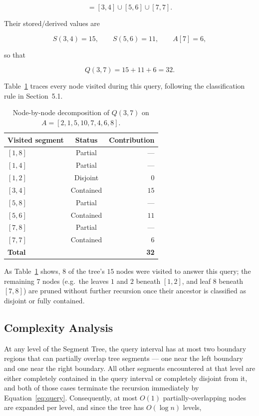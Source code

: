 \documentclass[11pt]{article}
\begin{document}
\begin{equation}
[3,7] = [3,4] \cup [5,6] \cup [7,7].
\end{equation}

Their stored/derived values are

\begin{equation}
S(3,4) = 15, \qquad S(5,6) = 11, \qquad A[7] = 6,
\end{equation}

so that

\begin{equation}
Q(3,7) = 15 + 11 + 6 = 32.
\end{equation}

Table~\ref{tab:decomp} traces every node visited during this query, following the classification rule in Section~5.1.

\begin{table}[h]
\centering
\caption{Node-by-node decomposition of $Q(3,7)$ on $A=[2,1,5,10,7,4,6,8]$.}
\label{tab:decomp}
\begin{tabular}{lcr}
\toprule
\textbf{Visited segment} & \textbf{Status} & \textbf{Contribution} \\
\midrule
$[1,8]$ & Partial   & --- \\
$[1,4]$ & Partial   & --- \\
$[1,2]$ & Disjoint  & $0$ \\
$[3,4]$ & Contained & $15$ \\
$[5,8]$ & Partial   & --- \\
$[5,6]$ & Contained & $11$ \\
$[7,8]$ & Partial   & --- \\
$[7,7]$ & Contained & $6$ \\
\midrule
\textbf{Total} & & \textbf{32} \\
\bottomrule
\end{tabular}
\end{table}

As Table~\ref{tab:decomp} shows, $8$ of the tree's $15$ nodes were visited to answer this query; the remaining $7$ nodes (e.g.\ the leaves $1$ and $2$ beneath $[1,2]$, and leaf $8$ beneath $[7,8]$) are pruned without further recursion once their ancestor is classified as disjoint or fully contained.

\subsection{Complexity Analysis}
\label{sec:overlap-argument}
At any level of the Segment Tree, the query interval has at most two boundary regions that can partially overlap tree segments --- one near the left boundary and one near the right boundary. All other segments encountered at that level are either completely contained in the query interval or completely disjoint from it, and both of those cases terminate the recursion immediately by Equation~\eqref{eq:query}. Consequently, at most $O(1)$ partially-overlapping nodes are expanded per level, and since the tree has $O(\log n)$ levels,
\end{document}
